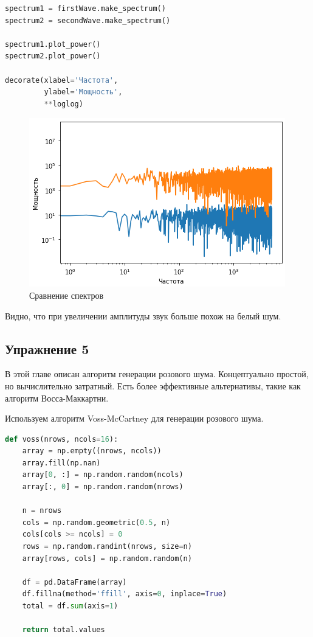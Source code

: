 \begin{lstlisting}[language=Python]
spectrum1 = firstWave.make_spectrum()
spectrum2 = secondWave.make_spectrum()

spectrum1.plot_power()
spectrum2.plot_power()

decorate(xlabel='Частота', 
         ylabel='Мощность', 
         **loglog)
\end{lstlisting}
\begin{figure}[H]
	\begin{center}
		\includegraphics[scale=1]{fig/lab04/lab4_6.png}
		\caption{Сравнение спектров}
	\end{center}
\end{figure}

Видно, что при увеличении амплитуды звук больше похож на белый шум.

\subsection{Упражнение 5}

В этой главе описан алгоритм генерации розового шума. Концептуально простой, но вычислительно затратный. Есть более эффективные альтернативы, такие как алгоритм Восса-Маккартни.

Используем алгоритм Voss-McCartney для генерации розового шума.

\begin{lstlisting}[language=Python]
def voss(nrows, ncols=16):
    array = np.empty((nrows, ncols))
    array.fill(np.nan)
    array[0, :] = np.random.random(ncols)
    array[:, 0] = np.random.random(nrows)
    
    n = nrows
    cols = np.random.geometric(0.5, n)
    cols[cols >= ncols] = 0
    rows = np.random.randint(nrows, size=n)
    array[rows, cols] = np.random.random(n)

    df = pd.DataFrame(array)
    df.fillna(method='ffill', axis=0, inplace=True)
    total = df.sum(axis=1)

    return total.values
\end{lstlisting}

